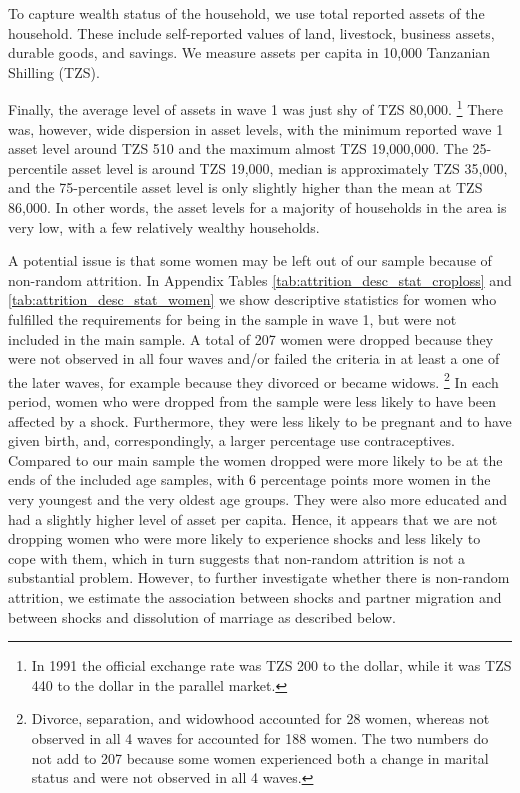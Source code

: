 \documentclass[letterpaper,12pt]{article}
\begin{document}
To capture wealth status of the household, we use total reported assets of the 
household.
These include self-reported values of land, livestock, business assets, durable
goods, and savings.
We measure assets per capita in 10,000 Tanzanian Shilling (TZS).

Finally, the average level of assets in wave 1 was just shy of TZS 80,000.%
\footnote{%
In 1991 the official exchange rate was TZS 200 to the dollar, while it
was TZS 440 to the dollar in the parallel market.
}
There was, however, wide dispersion in asset levels, with the minimum reported 
wave 1 asset level around TZS 510 and the maximum almost TZS 19,000,000.
The 25-percentile asset level is around TZS 19,000, median is approximately 
TZS 35,000, and the 75-percentile asset level is only slightly higher than the 
mean at TZS 86,000.
In other words, the asset levels for a majority of households in the area is very low,
with a few relatively wealthy households.

A potential issue is that some women may be left out of our sample because of
non-random attrition.
In Appendix Tables \ref{tab:attrition_desc_stat_croploss} and \ref{tab:attrition_desc_stat_women}
we show descriptive statistics for women who fulfilled the requirements for being in the 
sample in wave 1, but were not included in the main sample.
A total of 207 women were dropped because they were not observed in all four waves 
and/or failed the criteria in at least a one of the later waves, for example 
because they divorced or became widows.%
\footnote{
Divorce, separation, and widowhood accounted for 28 women, whereas not observed in all
4 waves for accounted for 188 women. 
The two numbers do not add to 207 because some women experienced both a change
in marital status and were not observed in all 4 waves.
}
In each period, women who were dropped from the sample were less likely to have been 
affected by a shock.
Furthermore, they were less likely to be pregnant and to have given birth, and,
correspondingly, a larger percentage use contraceptives.
Compared to our main sample the women dropped were more likely to be at the ends of
the included age samples, with 6 percentage points more women in the very youngest
and the very oldest age groups.
They were also more educated and had a slightly higher level of asset per capita.
Hence, it appears that we are not dropping women who were more likely to 
experience shocks and less likely to cope with them, which in turn suggests that 
non-random attrition is not a substantial problem.
However, to further investigate whether there is non-random attrition, we 
estimate the association between shocks and partner migration and between
shocks and dissolution of marriage as described below.
\end{document}

